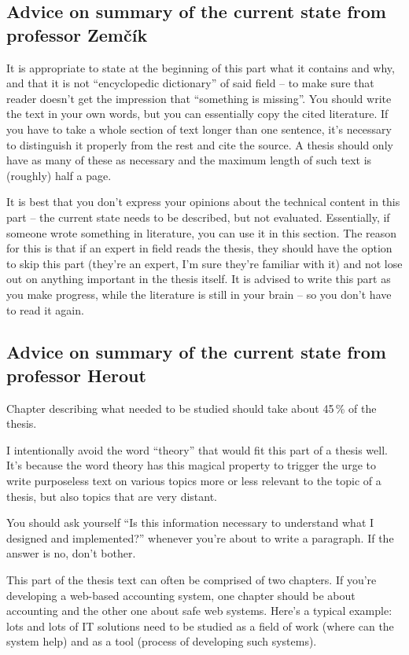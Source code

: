 \subsection{Advice on summary of the current state from professor Zemčík}

It is appropriate to state at the beginning of this part what it contains and why, and that it is not ``encyclopedic dictionary'' of said field -- to make sure that reader doesn't get the impression that ``something is missing''. You should write the text in your own words, but you can essentially copy the cited literature. If you have to take a whole section of text longer than one sentence, it's necessary to distinguish it properly from the rest and cite the source. A thesis should only have as many of these as necessary and the maximum length of such text is (roughly) half a page.

It is best that you don't express your opinions about the technical content in this part -- the current state needs to be described, but not evaluated. Essentially, if someone wrote something in literature, you can use it in this section. The reason for this is that if an expert in field reads the thesis, they should have the option to skip this part (they're an expert, I'm sure they're familiar with it) and not lose out on anything important in the thesis itself. It is advised to write this part as you make progress, while the literature is still in your brain -- so you don't have to read it again. 


\subsection{Advice on summary of the current state from professor Herout}

Chapter describing what needed to be studied should take about 45\,\% of the thesis.

I intentionally avoid the word ``theory'' that would fit this part of a thesis well. It's because the word theory has this magical property to trigger the urge to write purposeless text on various topics more or less relevant to the topic of a thesis, but also topics that are very distant.

You should ask yourself ``Is this information necessary to understand what I designed and implemented?'' whenever you're about to write a paragraph. If the answer is no, don't bother.

This part of the thesis text can often be comprised of two chapters. If you're developing a web-based accounting system, one chapter should be about accounting and the other one about safe web systems. Here's a typical example: lots and lots of IT solutions need to be studied as a field of work (where can the system help) and as a tool (process of developing such systems).


